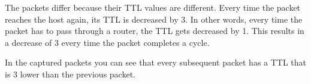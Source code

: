 The packets differ because their TTL values are different. Every time the packet reaches the host again, its TTL is decreased by 3. In other words, every time the packet has to pass through a router, the TTL gets decreased by 1. This results in a decrease of 3 every time the packet completes a cycle.



In the captured packets you can see that every subsequent packet has a TTL that is 3 lower than the previous packet.